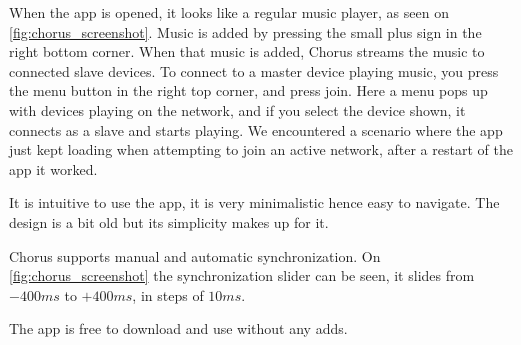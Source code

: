 When the app is opened, it looks like a regular music player, as seen on \cref{fig:chorus_screenshot}.
Music is added by pressing the small plus sign in the right bottom corner.
When that music is added, Chorus streams the music to connected slave devices.
To connect to a master device playing music, you press the menu button in the right top corner, and press join.
Here a menu pops up with devices playing on the network, and if you select the device shown, it connects as a slave and starts playing.
We encountered a scenario where the app just kept loading when attempting to join an active network, after a restart of the app it worked.

It is intuitive to use the app, it is very minimalistic hence easy to navigate.
The design is a bit old but its simplicity makes up for it.

Chorus supports manual and automatic synchronization.
On \cref{fig:chorus_screenshot} the synchronization slider can be seen,
it slides from $-400ms$ to $+400ms$, in steps of $10 ms$.

The app is free to download and use without any adds.\cite{chrous_play}

